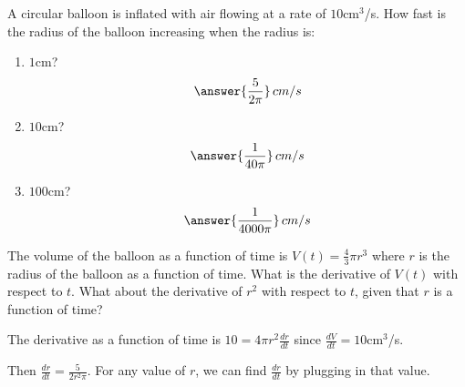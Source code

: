 \documentclass{ximera}
\author{Gregory Hartman \and Matthew Carr}
\begin{document}
\begin{exercise}




A circular balloon is inflated with air flowing at a rate of $10$cm$^3$/s. How fast is the radius of the balloon increasing when the radius is: \begin{enumerate}
\item		$1$cm? \[\answer{\frac{5}{2\pi}}\,cm/s\]
\item		$10$cm? \[\answer{\frac{1}{40\pi}}\,cm/s\]
\item		$100$cm? \[\answer{\frac{1}{4000\pi}}\,cm/s\]

\end{enumerate}

\begin{hint}
The volume of the balloon as a function of time is $V(t)=\frac{4}{3}\pi r^3$ where $r$ is the radius of the balloon as a function of time. What is the derivative of $V(t)$ with respect to $t$. What about the derivative of $r^2$ with respect to $t$, given that $r$ is a function of time?
\end{hint}
\begin{hint}
The derivative as a function of time is $10=4\pi r^2\frac{dr}{dt}$ since $\frac{dV}{dt}=10$cm$^3$/s.
\end{hint}
\begin{hint}
Then $\frac{dr}{dt}=\frac{5}{2r^2\pi}$. For any value of $r$, we can find $\frac{dr}{dt}$ by plugging in that value.
\end{hint}
\end{exercise}
\end{document}

